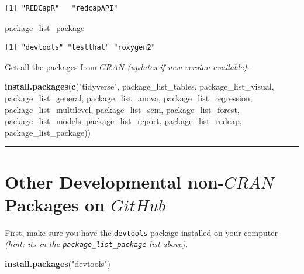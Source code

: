 \documentclass[]{book}
\newenvironment{Shaded}{\begin{snugshade}}{\end{snugshade}}
\newcommand{\KeywordTok}[1]{\textcolor[rgb]{0.13,0.29,0.53}{\textbf{#1}}}
\newcommand{\StringTok}[1]{\textcolor[rgb]{0.31,0.60,0.02}{#1}}
\newcommand{\NormalTok}[1]{#1}
\theoremstyle{definition}
\theoremstyle{definition}
\theoremstyle{definition}
\theoremstyle{remark}
\begin{document}
\begin{verbatim}
[1] "REDCapR"   "redcapAPI"
\end{verbatim}

\begin{Shaded}
\begin{Highlighting}[]
\NormalTok{package_list_package}
\end{Highlighting}
\end{Shaded}

\begin{verbatim}
[1] "devtools" "testthat" "roxygen2"
\end{verbatim}

Get all the packages from \(CRAN\) \emph{(updates if new version
available)}:

\begin{Shaded}
\begin{Highlighting}[]
\KeywordTok{install.packages}\NormalTok{(}\KeywordTok{c}\NormalTok{(}\StringTok{"tidyverse"}\NormalTok{,}
\NormalTok{                   package_list_tables,}
\NormalTok{                   package_list_visual,}
\NormalTok{                   package_list_general,}
\NormalTok{                   package_list_anova,}
\NormalTok{                   package_list_regression,}
\NormalTok{                   package_list_multilevel,}
\NormalTok{                   package_list_sem,}
\NormalTok{                   package_list_forest,}
\NormalTok{                   package_list_models,}
\NormalTok{                   package_list_report,}
\NormalTok{                   package_list_redcap,}
\NormalTok{                   package_list_package))}
\end{Highlighting}
\end{Shaded}

\begin{center}\rule{0.5\linewidth}{\linethickness}\end{center}

\section{\texorpdfstring{Other Developmental non-\(CRAN\) Packages on
\(GitHub\)}{Other Developmental non-CRAN Packages on GitHub}}\label{other-developmental-non-cran-packages-on-github}

First, make sure you have the \texttt{devtools} package installed on
your computer \emph{(hint: its in the \texttt{package\_list\_package}
list above)}.

\begin{Shaded}
\begin{Highlighting}[]
\KeywordTok{install.packages}\NormalTok{(}\StringTok{"devtools"}\NormalTok{)}
\end{Highlighting}
\end{Shaded}
\end{document}
